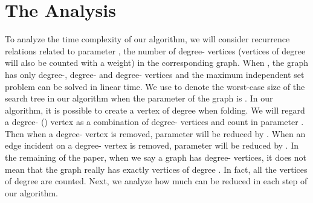 \documentclass[runningheads]{llncs}
\begin{document}
 \section{The Analysis}
To analyze the time complexity of our algorithm, we will consider
recurrence relations related to parameter , the number of
degree- vertices (vertices of degree  will also be
counted with a weight) in the corresponding graph. When , the
graph has only degree-, degree- and degree- vertices and
the maximum independent set problem can be solved in linear time.
We use  to denote the worst-case size of the search tree in
our algorithm when the parameter of the graph is . In our
algorithm, it is possible to create a vertex of degree 
when folding. We will regard a degree- () vertex as a
combination of  degree- vertices and count  in
parameter . Then when a degree- vertex is removed, parameter
 will be reduced by . When an edge incident on a
degree- vertex is removed, parameter  will be reduced by
. In the remaining of the paper, when we say a graph has 
degree- vertices, it does not mean that the graph really has
exactly  vertices of degree . In fact, all the vertices of
degree  are counted. Next, we analyze how much  can be
reduced in each step of our algorithm.




\end{document}
